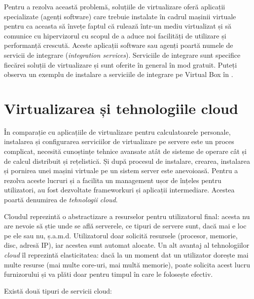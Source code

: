 Pentru a rezolva această
problemă, soluțiile de virtualizare oferă aplicații specializate (agenți
software) care trebuie instalate în cadrul mașinii virtuale pentru ca aceasta să
învețe faptul că rulează într-un mediu virtualizat și să comunice cu
hipervizorul cu scopul de a aduce noi facilități de utilizare și performanță
crescută. Aceste aplicații software sau agenți poartă numele de servicii de
integrare (\textit{integration services}). Serviciile de integrare sunt
specifice fiecărei soluții de virtualizare și sunt oferite în general în mod
gratuit. Puteți observa un exemplu de instalare a serviciile de integrare pe
Virtual Box în .

\section{Virtualizarea și tehnologiile cloud}
\label{sec:vm:cloud}

În comparație cu aplicațiile de virtualizare pentru calculatoarele personale,
instalarea și configurarea serviciilor de virtualizare pe servere este un proces
complicat, necesită cunoștințe tehnice avansate atât de sisteme de operare cât
și de calcul distribuit și rețelistică. Și după procesul de instalare, crearea,
instalarea și pornirea unei mașini virtuale pe un sistem server este anevoioasă.
Pentru a rezolva aceste lucruri și a facilita un management ușor de înțeles
pentru utilizatori, au fost dezvoltate frameworkuri și aplicații intermediare. Acestea poartă
denumirea de \textit{tehnologii cloud}.

Cloudul reprezintă o abstractizare a resurselor
pentru utilizatorul final: acesta nu are nevoie să știe unde se află
serverele, ce tipuri de servere sunt, dacă mai e loc pe ele sau nu, ș.a.m.d.
Utilizatorul doar solicită resursele (procesor, memorie, disc, adresă IP), iar
acestea sunt automat alocate. Un alt avantaj al tehnologiilor \textit{cloud} îl
reprezintă elasticitatea: dacă la un moment dat un utilizator dorește mai multe
resurse (mai multe core-uri, mai multă memorie), poate solicita acest lucru
furnizorului și va plăti doar pentru timpul în care le folosește efectiv.

Există două tipuri de servicii cloud:

